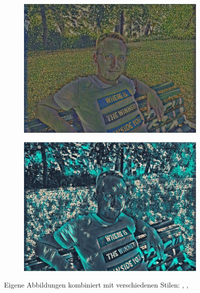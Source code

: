 \begin{figure}[H]
\begin{subfigure}[h]{0.21\textwidth}
        \includegraphics[width=\textwidth]{resources/content/experiments/ich-vgg16_portrait_of_joseph_roulin.jpg}
    \end{subfigure}
    \begin{subfigure}[h]{0.21\textwidth}
        \centering
        \includegraphics[width=\textwidth]{resources/content/experiments/ich-vgg16_teal_and_black_abstract_painting.jpg}
    \end{subfigure}

    \caption{Eigene Abbildungen kombiniert mit verschiedenen Stilen: \cite{crystal_glass_on_a_colorful_background_img}, \cite{portrait_of_joseph_roulin_img}, \cite{teal_and_black_abstract_painting_img}}
\end{figure}


